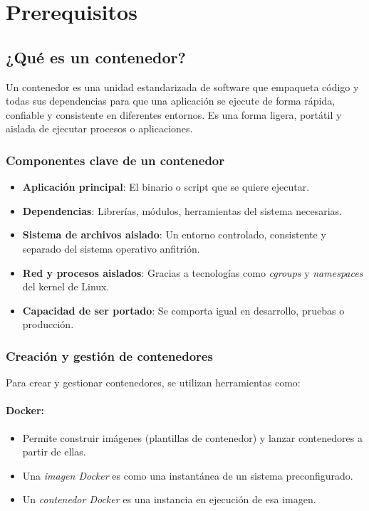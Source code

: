 \section{Prerequisitos}

\subsection{¿Qué es un contenedor?}

Un contenedor es una unidad estandarizada de software que empaqueta código y todas sus dependencias para que una aplicación se ejecute de forma rápida, confiable y consistente en diferentes entornos. Es una forma ligera, portátil y aislada de ejecutar procesos o aplicaciones.

\subsubsection{Componentes clave de un contenedor}
\begin{itemize}
    \item \textbf{Aplicación principal}: El binario o script que se quiere ejecutar.
    \item \textbf{Dependencias}: Librerías, módulos, herramientas del sistema necesarias.
    \item \textbf{Sistema de archivos aislado}: Un entorno controlado, consistente y separado del sistema operativo anfitrión.
    \item \textbf{Red y procesos aislados}: Gracias a tecnologías como \textit{cgroups} y \textit{namespaces} del kernel de Linux.
    \item \textbf{Capacidad de ser portado}: Se comporta igual en desarrollo, pruebas o producción.
\end{itemize}

\subsubsection{Creación y gestión de contenedores}
Para crear y gestionar contenedores, se utilizan herramientas como:

\paragraph{Docker:}
\begin{itemize}
    \item Permite construir imágenes (plantillas de contenedor) y lanzar contenedores a partir de ellas.
    \item Una \textit{imagen Docker} es como una instantánea de un sistema preconfigurado.
    \item Un \textit{contenedor Docker} es una instancia en ejecución de esa imagen.
\end{itemize}

